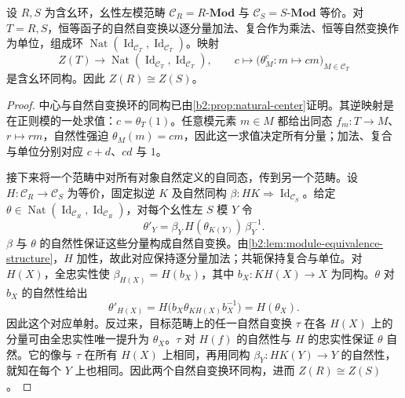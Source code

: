 \begin{proposition}\label{b2:prop:morita-center}
	设 \(R,S\) 为含幺环，幺性左模范畴 \(\mathcal C_R=R\text{-}\mathbf{Mod}\) 与 \(\mathcal C_S=S\text{-}\mathbf{Mod}\) 等价。对 \(T=R,S\)，恒等函子的自然自变换以逐分量加法、复合作为乘法、恒等自然变换作为单位，组成环 \(\operatorname{Nat}(\operatorname{Id}_{\mathcal C_T},\operatorname{Id}_{\mathcal C_T})\)。映射
	\[
		Z(T)\longrightarrow \operatorname{Nat}(\operatorname{Id}_{\mathcal C_T},\operatorname{Id}_{\mathcal C_T}), \qquad c\longmapsto\bigl(\theta^c_M:m\longmapsto cm\bigr)_{M\in\mathcal C_T}
	\]
	是含幺环同构。因此 \(Z(R)\cong Z(S)\)。
\end{proposition}
\begin{proof}
	中心与自然自变换环的同构已由\cref{b2:prop:natural-center}证明。其逆映射是在正则模的一处求值：\(c=\theta_T(1)\)。任意模元素 \(m\in M\) 都给出同态 \(f_m:T\to M\)、\(r\mapsto rm\)，自然性强迫 \(\theta_M(m)=cm\)，因此这一求值决定所有分量；加法、复合与单位分别对应 \(c+d\)、\(cd\) 与 \(1\)。

	接下来将一个范畴中对所有对象自然定义的自同态，传到另一个范畴。设 \(H:\mathcal C_R\rightarrow\mathcal C_S\) 为等价，固定拟逆 \(K\) 及自然同构 \(\beta:HK\Rightarrow\operatorname{Id}_{\mathcal C_S}\)。给定 \(\theta\in\operatorname{Nat}(\operatorname{Id}_{\mathcal C_R},\operatorname{Id}_{\mathcal C_R})\)，对每个幺性左 \(S\) 模 \(Y\) 令
	\[
		\theta'_Y=\beta_Y\,H(\theta_{K(Y)})\,\beta_Y^{-1}.
	\]
	\(\beta\) 与 \(\theta\) 的自然性保证这些分量构成自然自变换。由\cref{b2:lem:module-equivalence-structure}，\(H\) 加性，故此对应保持逐分量加法；共轭保持复合与单位。对 \(H(X)\)，全忠实性使 \(\beta_{H(X)}=H(b_X)\)，其中 \(b_X:KH(X)\to X\) 为同构。\(\theta\) 对 \(b_X\) 的自然性给出
	\[
		\theta'_{H(X)} =H\bigl(b_X\theta_{KH(X)}b_X^{-1}\bigr) =H(\theta_X).
	\]
	因此这个对应单射。反过来，目标范畴上的任一自然自变换 \(\tau\) 在各 \(H(X)\) 上的分量可由全忠实性唯一提升为 \(\theta_X\)。\(\tau\) 对 \(H(f)\) 的自然性与 \(H\) 的忠实性保证 \(\theta\) 自然。它的像与 \(\tau\) 在所有 \(H(X)\) 上相同，再用同构 \(\beta_Y:HK(Y)\to Y\) 的自然性，就知在每个 \(Y\) 上也相同。因此两个自然自变换环同构，进而 \(Z(R)\cong Z(S)\)。
\end{proof}


